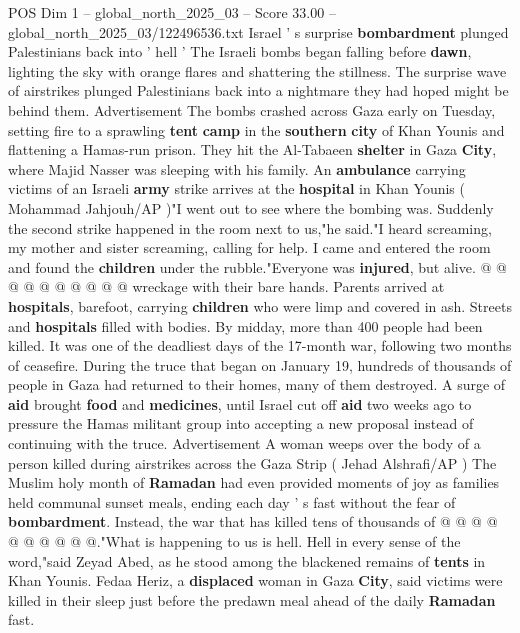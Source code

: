 \begin{textsample}{POS Dim 1 – global\_north\_2025\_03 – Score 33.00 – global\_north\_2025\_03/122496536.txt}  \label{ex:f1_pos_394}
Israel ' s surprise \textbf{bombardment} plunged Palestinians back into ' hell ' The Israeli bombs began falling before \textbf{dawn}, lighting the sky with orange flares and shattering the stillness.
The surprise wave of airstrikes plunged Palestinians back into a nightmare they had hoped might be behind them.
Advertisement The bombs crashed across Gaza early on Tuesday, setting fire to a sprawling \textbf{tent} \textbf{camp} in the \textbf{southern} \textbf{city} of Khan Younis and flattening a Hamas-run prison.
They hit the Al-Tabaeen \textbf{shelter} in Gaza \textbf{City}, where Majid Nasser was sleeping with his family.
An \textbf{ambulance} carrying victims of an Israeli \textbf{army} strike arrives at the \textbf{hospital} in Khan Younis ( Mohammad Jahjouh/AP )"I went out to see where the bombing was.
Suddenly the second strike happened in the room next to us,"he said."I heard screaming, my mother and sister screaming, calling for help.
I came and entered the room and found the \textbf{children} under the rubble."Everyone was \textbf{injured}, but alive. @ @ @ @ @ @ @ @ @ @ wreckage with their bare hands.
Parents arrived at \textbf{hospitals}, barefoot, carrying \textbf{children} who were limp and covered in ash.
Streets and \textbf{hospitals} filled with bodies.
By midday, more than 400 people had been killed.
It was one of the deadliest days of the 17-month war, following two months of ceasefire.
During the truce that began on January 19, hundreds of thousands of people in Gaza had returned to their homes, many of them destroyed.
A surge of \textbf{aid} brought \textbf{food} and \textbf{medicines}, until Israel cut off \textbf{aid} two weeks ago to pressure the Hamas militant group into accepting a new proposal instead of continuing with the truce.
Advertisement A woman weeps over the body of a person killed during airstrikes across the Gaza Strip ( Jehad Alshrafi/AP ) The Muslim holy month of \textbf{Ramadan} had even provided moments of joy as families held communal sunset meals, ending each day ' s fast without the fear of \textbf{bombardment}.
Instead, the war that has killed tens of thousands of @ @ @ @ @ @ @ @ @ @."What is happening to us is hell.
Hell in every sense of the word,"said Zeyad Abed, as he stood among the blackened remains of \textbf{tents} in Khan Younis.
Fedaa Heriz, a \textbf{displaced} woman in Gaza \textbf{City}, said victims were killed in their sleep just before the predawn meal ahead of the daily \textbf{Ramadan} fast.

\end{textsample}
